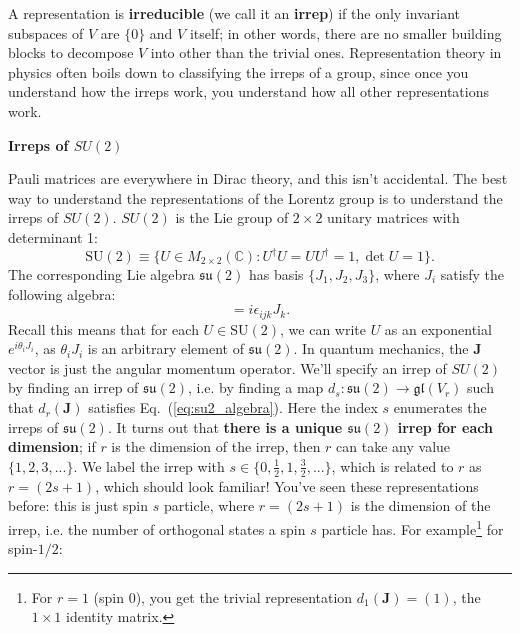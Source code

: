 \documentclass[12pt, oneside]{article}   	%
\theoremstyle{definition}
\begin{document}
\begin{itemize}
	A representation is \textbf{irreducible} (we call it an \textbf{irrep}) if the only invariant subspaces of $V$ are $\{0\}$ and $V$ itself; in other words, there are no smaller building blocks to decompose $V$ into other than the trivial ones. Representation theory in physics often boils down to classifying the irreps of a group, since once you understand how the irreps work, you understand how all other representations work. 

\vspace{0.2cm}
\begin{answerbox}
	{\centering \textbf{Irreps of $SU(2)$} } \\
	
	\raggedright
	Pauli matrices are everywhere in Dirac theory, and this isn't accidental. The best way to understand the representations of the Lorentz group is to understand the irreps of $SU(2)$. $SU(2)$ is the Lie group of $2\times 2$ unitary matrices with determinant 1:
	\begin{equation}
		\mathrm{SU}(2) \equiv \{ U\in M_{2\times 2}(\mathbb C) : U^\dagger U = UU^\dagger = 1, \det U = 1\}.
	\end{equation}
	The corresponding Lie algebra $\mathfrak{su}(2)$ has basis $\{J_1, J_2, J_3\}$, where $J_i$ satisfy the following algebra:
	\begin{equation}
		[J_i, J_j] = i\epsilon_{ijk} J_k.\label{eq:su2_algebra}
	\end{equation}
	Recall this means that for each $U\in \mathrm{SU}(2)$, we can write $U$ as an exponential $e^{i \theta_i J_i}$, as $\theta_i J_i$ is an arbitrary element of $\mathfrak{su}(2)$. In quantum mechanics, the $\bm J$ vector is just the angular momentum operator. We'll specify an irrep of $SU(2)$ by finding an irrep of $\mathfrak{su}(2)$, i.e. by finding a map $d_s : \mathfrak{su}(2)\rightarrow \mathfrak{gl}(V_r)$ such that $d_r(\bm J)$ satisfies Eq.~(\ref{eq:su2_algebra}). Here the index $s$ enumerates the irreps of $\mathfrak{su}(2)$. It turns out that \textbf{there is a unique $\mathfrak{su}(2)$ irrep for each dimension}; if $r$ is the dimension of the irrep, then $r$ can take any value $\{1, 2, 3, ...\}$. We label the irrep with $s\in \{0, \frac{1}{2}, 1, \frac{3}{2}, ...\}$, which is related to $r$ as $r = (2s + 1)$, which should look familiar! You've seen these representations before: this is just spin $s$ particle, where $r = (2s + 1)$ is the dimension of the irrep, i.e. the number of orthogonal states a spin $s$ particle has. For example\footnote{For $r = 1$ (spin 0), you get the trivial representation $d_1(\bm J) = (1)$, the $1\times 1$ identity matrix.} for spin-$1/2$:

\end{answerbox}
\end{itemize}
\end{document}
